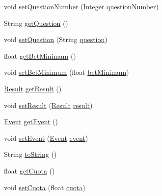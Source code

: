 \begin{DoxyCompactItemize}
void \mbox{\hyperlink{classdomain_1_1Question_a15eb1f8e8b06528ef1b27fcca4712ef8}{set\+Question\+Number}} (Integer \mbox{\hyperlink{classdomain_1_1Question_a0570239b13202e004eef891b49db538e}{question\+Number}})
\item 
String \mbox{\hyperlink{classdomain_1_1Question_a59bf69a5982ce79e89599ffe17c89790}{get\+Question}} ()
\item 
void \mbox{\hyperlink{classdomain_1_1Question_a612ee55b9eac9032980063ddb1119eee}{set\+Question}} (String \mbox{\hyperlink{classdomain_1_1Question_a3f1c6038e83e09658df60eed71e5deb4}{question}})
\item 
float \mbox{\hyperlink{classdomain_1_1Question_af19b6e4550cb22d52e44b3fe9fe4e62a}{get\+Bet\+Minimum}} ()
\item 
void \mbox{\hyperlink{classdomain_1_1Question_a66ef61fd241c1ee6dbb8ea9ce14ae9ce}{set\+Bet\+Minimum}} (float \mbox{\hyperlink{classdomain_1_1Question_a24ff305bdbaca1ac5ea5263f8f9be7d2}{bet\+Minimum}})
\item 
\mbox{\hyperlink{classdomain_1_1Result}{Result}} \mbox{\hyperlink{classdomain_1_1Question_a608b5afe5363593b9e1c2e2db929346d}{get\+Result}} ()
\item 
void \mbox{\hyperlink{classdomain_1_1Question_a22d08940b4ce10963bb93d7c3017d458}{set\+Result}} (\mbox{\hyperlink{classdomain_1_1Result}{Result}} \mbox{\hyperlink{classdomain_1_1Question_a74d098c940c1c91c8f37fd9288ebd3d3}{result}})
\item 
\mbox{\hyperlink{classdomain_1_1Event}{Event}} \mbox{\hyperlink{classdomain_1_1Question_a79d1d7cbea1d099aef2e77f4d338c17f}{get\+Event}} ()
\item 
void \mbox{\hyperlink{classdomain_1_1Question_aeef540c71cd56151c4bd3b9d1aab5dd4}{set\+Event}} (\mbox{\hyperlink{classdomain_1_1Event}{Event}} \mbox{\hyperlink{classdomain_1_1Question_a375d8735a06d8a8b12fe643bb31f4c14}{event}})
\item 
String \mbox{\hyperlink{classdomain_1_1Question_a3a94b2446ffde13851ce20b42199454e}{to\+String}} ()
\item 
float \mbox{\hyperlink{classdomain_1_1Question_ac4679028e21545e9d342c6dfbb4e7273}{get\+Cuota}} ()
\item 
void \mbox{\hyperlink{classdomain_1_1Question_a2025d578b6bfb29a5cc5f511eedaad3e}{set\+Cuota}} (float \mbox{\hyperlink{classdomain_1_1Question_a532249286ab9f5f211a030892bcd6756}{cuota}})
\end{DoxyCompactItemize}
